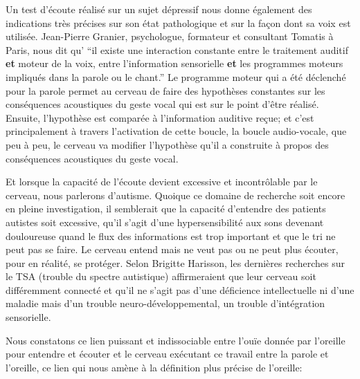 

Un test d'écoute réalisé sur un sujet dépressif nous donne également des indications
très précises sur son état
pathologique et sur la façon dont sa voix est utilisée. Jean-Pierre
Granier, psychologue, formateur et consultant Tomatis à Paris, nous dit qu' 
``il existe une 
interaction
constante entre le traitement auditif \textbf{et} moteur de la
voix, entre l'information sensorielle \textbf{et} les programmes moteurs impliqués
dans la parole ou le chant.'' Le programme moteur qui a été déclenché
pour la parole permet au cerveau de faire des hypothèses constantes
sur les conséquences acoustiques du geste vocal qui est sur le point
d'être réalisé. Ensuite, l'hypothèse est comparée à l'information
auditive reçue; et c'est principalement à travers l'activation de cette boucle, la
boucle audio-vocale, que peu à peu, le cerveau va modifier l'hypothèse
qu'il a construite à propos des conséquences acoustiques du geste vocal.





Et lorsque la capacité de l'écoute devient excessive et incontrôlable par le cerveau, nous 
parlerons d'autisme. Quoique
  ce domaine de recherche  soit encore en pleine investigation, il semblerait que la capacité 
  d'entendre des patients autistes soit excessive, qu'il s'agit d'une hypersensibilité aux sons 
  devenant douloureuse quand  le flux des informations est trop important et que le tri ne 
  peut pas se faire. Le cerveau entend mais ne veut pas ou ne peut plus  écouter, pour en 
  réalité, se protéger.
Selon Brigitte Harisson,  
 les dernières recherches sur le TSA (trouble du spectre autistique) affirmeraient que leur
  cerveau soit différemment connecté et qu'il ne s'agit pas d'une déficience intellectuelle ni
   d'une maladie mais d'un trouble neuro-développemental, un trouble
  d'intégration sensorielle.\autocite[Cet ouvrage propose une description unique du TSA
   (trouble du spectre de l'autisme pp. 22--23)]{harrisson.st-charles:lautisme}

Nous constatons ce lien puissant et indissociable  entre l'ouïe donnée
par l'oreille pour entendre et écouter et le cerveau exécutant ce
travail entre la 
parole et l'oreille, ce lien qui nous amène à la définition plus précise de
l'oreille: 





